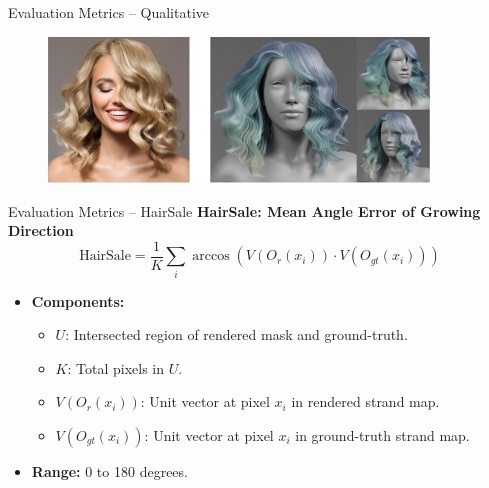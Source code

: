 \begin{frame}{Evaluation Metrics -- Qualitative}
    \begin{figure}
        \centering
        \includegraphics[width=0.9\textwidth]{assets/figures/eval/metrics/input-output.png}
    \end{figure}
\end{frame}

\begin{frame}[t]{Evaluation Metrics -- HairSale}
    \textbf{HairSale: Mean Angle Error of Growing Direction}
    \begin{equation*}
        \text{HairSale} = \frac{1}{K} \sum_{i} \arccos\left( V(O_r(x_i)) \cdot V(O_{gt}(x_i)) \right)
    \end{equation*}
    \begin{itemize}
        \item \textbf{Components:}
        \begin{itemize}
            \item \(U\): Intersected region of rendered mask and ground-truth.
            \item \(K\): Total pixels in \(U\).
            \item \(V(O_r(x_i))\): Unit vector at pixel \(x_i\) in rendered strand map.
            \item \(V(O_{gt}(x_i))\): Unit vector at pixel \(x_i\) in ground-truth strand map.
        \end{itemize}
        \item \textbf{Range:} 0 to 180 degrees.
    \end{itemize}
\end{frame}


